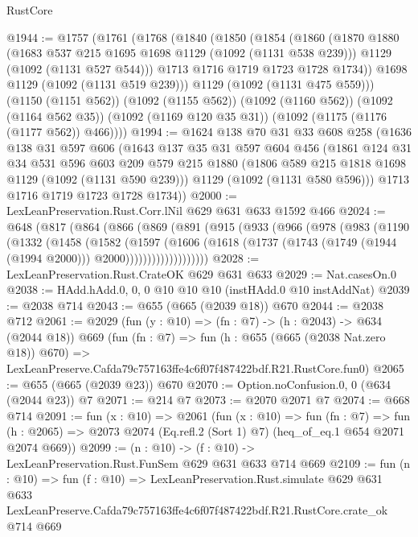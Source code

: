 \begin{lexlean}{RustCore}
\begin{coremodule}
@1944 := @1757
    (@1761
      (@1768
        (@1840
          (@1850
            (@1854
              (@1860
                (@1870
                  @1880
                  (@1683 @537 @215 @1695 @1698 @1129 (@1092 (@1131 @538 @239)))
                  @1129
                  (@1092 (@1131 @527 @544)))
                @1713
                @1716
                @1719
                @1723
                @1728
                @1734))
            @1698
            @1129
            (@1092 (@1131 @519 @239)))
          @1129
          (@1092 (@1131 @475 @559)))
        (@1150 (@1151 @562))
        (@1092 (@1155 @562))
        (@1092 (@1160 @562))
        (@1092 (@1164 @562 @35))
        (@1092 (@1169 @120 @35 @31))
        (@1092 (@1175 (@1176 (@1177 @562)) @466))))
@1994 := @1624
    @138
    @70
    @31
    @33
    @608
    @258
    (@1636
      @138
      @31
      @597
      @606
      (@1643
        @137
        @35
        @31
        @597
        @604
        @456
        (@1861
          @124
          @31
          @34
          @531
          @596
          @603
          @209
          @579
          @215
          @1880
          (@1806 @589 @215 @1818 @1698 @1129 (@1092 (@1131 @590 @239)))
          @1129
          (@1092 (@1131 @580 @596)))
        @1713
        @1716
        @1719
        @1723
        @1728
        @1734))
@2000 := LexLeanPreservation.Rust.Corr.lNil @629 @631 @633 @1592 @466
@2024 := @648
    (@817
      (@864
        (@866
          (@869
            (@891
              (@915
                (@933
                  (@966
                    (@978
                      (@983
                        (@1190
                          (@1332
                            (@1458
                              (@1582
                                (@1597
                                  (@1606
                                    (@1618
                                      (@1737
                                        (@1743
                                          (@1749 (@1944 (@1994 @2000)))
                                          @2000)))))))))))))))))))
@2028 := LexLeanPreservation.Rust.CrateOK @629 @631 @633
@2029 := Nat.casesOn.{0}
@2038 := HAdd.hAdd.{0, 0, 0} @10 @10 @10 (instHAdd.{0} @10 instAddNat)
@2039 := @2038 @714
@2043 := @655 (@665 (@2039 @18)) @670
@2044 := @2038 @712
@2061 := @2029
    (fun (y : @10) => (fn : @7) -> (h : @2043) -> @634 (@2044 @18))
    @669
    (fun (fn : @7) =>
    fun (h : @655 (@665 (@2038 Nat.zero @18)) @670) =>
    LexLeanPreserve.Cafda79c757163ffe4c6f07f487422bdf.R21.RustCore.fun0)
@2065 := @655 (@665 (@2039 @23)) @670
@2070 := Option.noConfusion.{0, 0} (@634 (@2044 @23)) @7
@2071 := @214 @7
@2073 := @2070 @2071 @7
@2074 := @668 @714
@2091 := fun (x : @10) =>
  @2061
    (fun (x : @10) =>
    fun (fn : @7) =>
    fun (h : @2065) => @2073 @2074 (Eq.refl.{2} (Sort 1) @7) (heq_of_eq.{1} @654 @2071 @2074 @669))
@2099 := (n : @10) -> (f : @10) -> LexLeanPreservation.Rust.FunSem @629 @631 @633 @714 @669
@2109 := fun (n : @10) =>
  fun (f : @10) =>
  LexLeanPreservation.Rust.simulate
    @629
    @631
    @633
    LexLeanPreserve.Cafda79c757163ffe4c6f07f487422bdf.R21.RustCore.crate_ok
    @714
    @669
\end{coremodule}
\end{lexlean}
